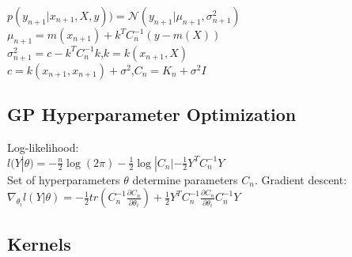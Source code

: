 $p(y_{n+1}|x_{n+1}, X, y)) = \mathcal{N}(y_{n+1} | \mu_{n+1}, \sigma^2_{n+1})$	\\
$\mu_{n+1} = m(x_{n+1})+k^T C^{-1}_n (y\!-\!m(X))$ \\
$\sigma^2_{n+1} = c - k^T C^{-1}_n k$,$k = k(x_{n+1}, X)$ \\
$c = k(x_{n+1},x_{n+1})\!+\!\sigma^2$,$C_n = K_n + \sigma^2 I$

\subsection*{GP Hyperparameter Optimization}
Log-likelihood:\\
$l(Y|\theta) = -\frac{n}{2} \log(2\pi) - \frac{1}{2} \log |C_n| - \frac{1}{2} Y^T C_n^{-1}Y$\\
Set of hyperparameters $\theta$ determine parameters $C_n$. Gradient descent: $\nabla_{\theta_i}l(Y|\theta) = -\frac{1}{2}tr(C_n^{-1} \frac{\partial C_n}{\partial \theta_i}) + \frac{1}{2} Y^T C_n^{-1} \frac{\partial C_n}{\partial \theta_i} C_n^{-1} Y$

\subsection*{Kernels}
\begin{comment}
	Closure Properties: {\tiny psd prop. closed under pointwise limits (since each $K_n$ is a kernel)} \\
    $k(x,y) = k_1(x,y) + k_2(x,y)$, $k(x,y) = k_1(x,y)k_2(x,y)$\\
	$k(x,y) = f(x)f(y)$, $k(x,y) = k_3(\phi(x),\phi(y))$\\
    $k(x,y) = \exp(\alpha k_1(x,y)), \alpha > 0$, $|X \cap Y| = kernel$\\
	$k(x,y) = p(k_1(x,y)), \, p(\cdot)$ {\tiny\text{polynomial with pos. coeff.}}\\   
	$k(x,y)=k_1(x,y)/ \sqrt{(k_1(x,x) k_1(y,y)}$\\
\end{comment}

